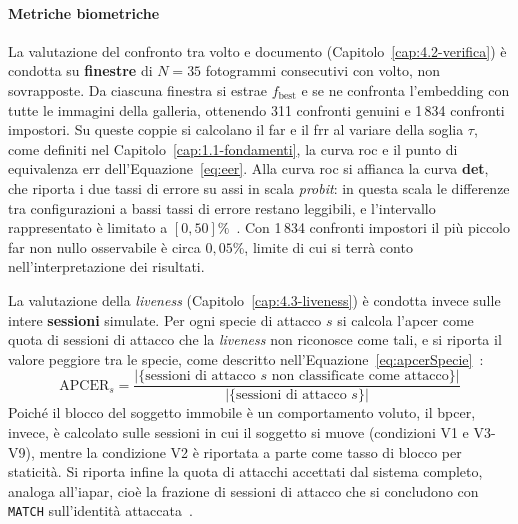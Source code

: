 \paragraph{Metriche biometriche}
La valutazione del confronto tra volto e documento (Capitolo~\ref{cap:4.2-verifica}) è condotta su \textbf{finestre} di $N = 35$ fotogrammi consecutivi con volto, non sovrapposte.
Da ciascuna finestra si estrae $f_{\text{best}}$ e se ne confronta l'embedding con tutte le immagini della galleria, ottenendo 311 confronti genuini e 1\,834 confronti impostori.
Su queste coppie si calcolano il \gls{far} e il \gls{frr} al variare della soglia $\tau$, come definiti nel Capitolo~\ref{cap:1.1-fondamenti}, la curva \gls{roc} e il punto di equivalenza \gls{err} dell'Equazione~\eqref{eq:eer}.
Alla curva \gls{roc} si affianca la curva \textbf{\gls{det}}, che riporta i due tassi di errore su assi in scala \textit{probit}: in questa scala le differenze tra configurazioni a bassi tassi di errore restano leggibili, e l'intervallo rappresentato è limitato a $[0, 50]\%$~\cite{gonzalezForgedPresentationAttack2025}.
Con 1\,834 confronti impostori il più piccolo \gls{far} non nullo osservabile è circa $0{,}05\%$, limite di cui si terrà conto nell'interpretazione dei risultati.

La valutazione della \textit{liveness} (Capitolo~\ref{cap:4.3-liveness}) è condotta invece sulle intere \textbf{sessioni} simulate.
Per ogni specie di attacco $s$ si calcola l'\gls{apcer} come quota di sessioni di attacco che la \textit{liveness} non riconosce come tali, e si riporta il valore peggiore tra le specie, come descritto nell'Equazione~\eqref{eq:apcerSpecie}~\cite{gonzalezForgedPresentationAttack2025,groupBiometricLivenessPresentation}:
\begin{equation}
    \label{eq:apcerSpecie}
    \text{APCER}_s = \frac{\left|\{\text{sessioni di attacco } s \text{ non classificate come attacco}\}\right|}{\left|\{\text{sessioni di attacco } s\}\right|}
\end{equation}
Poiché il blocco del soggetto immobile è un comportamento voluto, il \gls{bpcer}, invece, è calcolato sulle sessioni in cui il soggetto si muove (condizioni V1 e V3-V9), mentre la condizione V2 è riportata a parte come tasso di blocco per staticità.
Si riporta infine la quota di attacchi accettati dal sistema completo, analoga all'\gls{iapar}, cioè la frazione di sessioni di attacco che si concludono con \texttt{MATCH} sull'identità attaccata~\cite{groupBiometricLivenessPresentation}.

